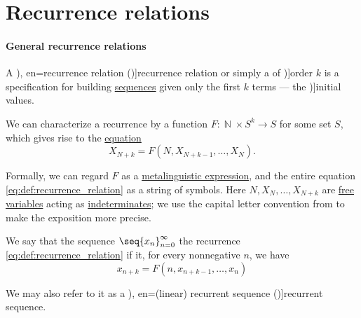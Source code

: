 \section{Recurrence relations}\label{sec:recurrence_relations}

\paragraph{General recurrence relations}

\begin{definition}\label{def:recurrence_relation}\mimprovised
  A \term[ru=рекуррентное уравнение (\cite[21]{Юмагулов2015ДинамическиеСистемы}), en=recurrence relation (\cite[def. 2.4.4]{Rosen2019DiscreteMathematics})]{recurrence relation} or simply a  of \term[en=order (of linear recurring sequence) (\cite[395]{LidlNiederreiter1997FiniteFields})]{order} \( k \) is a specification for building \hyperref[def:sequence]{sequences} given only the first \( k \) terms --- the \term[en=initial values (\cite[396]{LidlNiederreiter1997FiniteFields})]{initial values}.

  We can characterize a recurrence by a function \( F: \BbbN \times S^k \to S \) for some set \( S \), which gives rise to the \hyperref[def:equation]{equation}
  \begin{equation}\label{eq:def:recurrence_relation}
    X_{N+k} = F(N, X_{N+k-1}, \ldots, X_N).
  \end{equation}

  Formally, we can regard \( F \) as a \hyperref[con:expression]{metalinguistic expression}, and the entire equation \eqref{eq:def:recurrence_relation} as a string of symbols. Here \( N, X_N, \ldots, X_{N+k} \) are \hyperref[con:variable_binding]{free variables} acting as \hyperref[con:indeterminate]{indeterminates}; we use the capital letter convention from  to make the exposition more precise.

  \begin{thmenum}
     We say that the sequence \( \seq{ x_n }_{n=0}^\infty \)  the recurrence \eqref{eq:def:recurrence_relation} if it, for every nonnegative \( n \), we have
    \begin{equation}\label{eq:def:recurrence_relation/sequence}
      x_{n+k} = F(n, x_{n+k-1}, \ldots, x_n)
    \end{equation}

    We may also refer to it as a \term[ru=рекуррентная последовательность (\cite[21]{Юмагулов2015ДинамическиеСистемы}), en=(linear) recurrent sequence (\cite[395]{LidlNiederreiter1997FiniteFields})]{recurrent sequence}.


\end{thmenum}
\end{definition}
